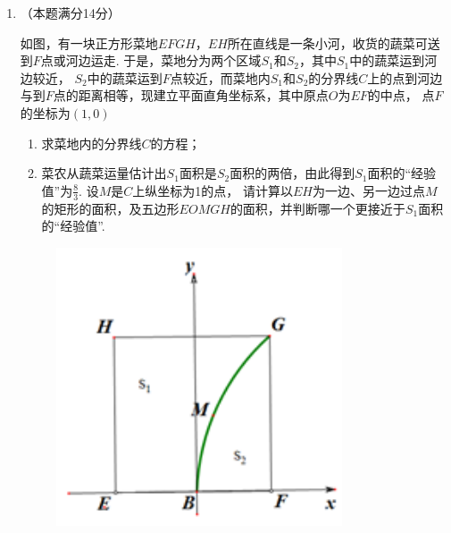 \documentclass[12pt,space]{ctexart} %
\begin{document}
\begin{enumerate}[itemsep=-0.3em,topsep=0pt, resume]
    \item （本题满分14分）\\[0.5em] 
    \begin{minipage}[h][16em][t]{.63\textwidth}
      如图，有一块正方形菜地$EFGH$，$EH$所在直线是一条小河，收货的蔬菜可送到$F$点或河边运走. 于是，菜地分为两个区域$S_1$和$S_2$，其中$S_1$中的蔬菜运到河边较近，
      $S_2$中的蔬菜运到$F$点较近，而菜地内$S_1$和$S_2$的分界线$C$上的点到河边与到$F$点的距离相等，现建立平面直角坐标系，其中原点$O$为$EF$的中点，
      点$F$的坐标为$(1,0)$
      \begin{enumerate}[itemsep=-0.3em,label={(\arabic*)},topsep=0pt,labelsep=.5em,leftmargin=1.7em]
        \item 求菜地内的分界线$C$的方程；
        \item 菜农从蔬菜运量估计出$S_1$面积是$S_2$面积的两倍，由此得到$S_1$面积的“经验值”为$\displaystyle{\frac 83}$. 设$M$是$C$上纵坐标为1的点，
              请计算以$EH$为一边、另一边过点$M$的矩形的面积，及五边形$EOMGH$的面积，并判断哪一个更接近于$S_1$面积的“经验值”. 
      \end{enumerate}
    \end{minipage}
    \begin{minipage}[h][9em][b]{.35\textwidth}
      \begin{figure}[H]
        \centering
        \includegraphics[width=0.8\textwidth]{Image/sh-20.png}
      \end{figure}
    \end{minipage}


\end{enumerate}
\end{document}
